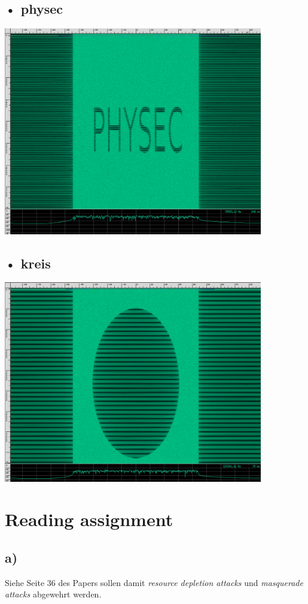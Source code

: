 \documentclass[12pt,a4paper]{article}
\begin{document}
\subsection*{• physec}
\includegraphics[width=0.85\textwidth ]{Bilder/A2_physec.png}

\subsection*{• kreis}
\includegraphics[width=0.85\textwidth ]{Bilder/A2_kreis.png}



\section{Reading assignment}

\subsection{a)} 
Siehe Seite 36 des Papers sollen damit \textit{resource 
depletion attacks} und \textit{masquerade attacks} 
abgewehrt werden.
\end{document}
